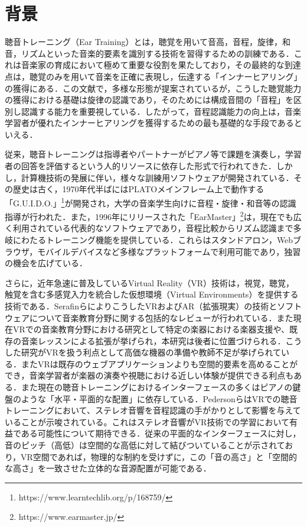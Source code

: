 \section{背景} \label{sec:background}
聴音トレーニング（Ear Training）とは，聴覚を用いて音高，音程，旋律，和音，リズムといった音楽的要素を識別する技術を習得するための訓練である．これは音楽家の育成において極めて重要な役割を果たしており，その最終的な到達点は，聴覚のみを用いて音楽を正確に表現し，伝達する「インナーヒアリング」の獲得にある\cite{woody2012playing}．この文献で，多様な形態が提案されているが，こうした聴覚能力の獲得における基礎は旋律の認識であり，そのためには構成音間の「音程」を区別し認識する能力を重要視している．したがって，音程認識能力の向上は，音楽学習者が優れたインナーヒアリングを獲得するための最も基礎的な手段であるといえる．

従来，聴音トレーニングは指導者やパートナーがピアノ等で課題を演奏し，学習者の回答を評価するという人的リソースに依存した形式で行われてきた．しかし，計算機技術の発展に伴い，様々な訓練用ソフトウェアが開発されている．その歴史は古く，1970年代半ばにはPLATOメインフレーム上で動作する「G.U.I.D.O.」\footnote{https://www.learntechlib.org/p/168759/}が開発され，大学の音楽学生向けに音程・旋律・和音等の認識指導が行われた．また，1996年にリリースされた「EarMaster」\footnote{https://www.earmaster.jp/}は，現在でも広く利用されている代表的なソフトウェアであり，音程比較からリズム認識まで多岐にわたるトレーニング機能を提供している．これらはスタンドアロン，Webブラウザ，モバイルデバイスなど多様なプラットフォームで利用可能であり，独習の機会を広げている．

さらに，近年急速に普及しているVirtual Reality（VR）技術は，視覚，聴覚，触覚を含む多感覚入力を統合した仮想環境（Virtual Environments）を提供する技術である．SerafinらによりこうしたVRおよびAR（拡張現実）の技術とソフトウェアについて音楽教育分野に関する包括的なレビューが行われている\cite{serafin2017considerations}．また現在VRでの音楽教育分野における研究として特定の楽器における楽器支援\cite{gao2024application}や、既存の音楽レッスンによる拡張\cite{liu2025research}が挙げられ，本研究は後者に位置づけられる．こうした研究がVRを扱う利点として高価な機器の準備や教師不足が挙げられている．またVRは既存のウェブアプリケーションよりも空間的要素を高めることができ，音楽学習者が楽器の演奏や視聴における近しい体験が提供できる利点もある．また現在の聴音トレーニングにおけるインターフェースの多くはピアノの鍵盤のような「水平・平面的な配置」に依存している．PedersonらはVRでの聴音トレーニングにおいて、ステレオ音響を音程認識の手がかりとして影響を与えていることが示唆されている\cite{pedersen2020spatialized}。これはステレオ音響がVR技術での学習において有益である可能性について期待できる．従来の平面的なインターフェースに対し，音のピッチ（高低）は空間的な高低に対して結びついていることが示されており\cite{rusconi2006spatial}，VR空間であれば，物理的な制約を受けずに，この「音の高さ」と「空間的な高さ」を一致させた立体的な音源配置が可能である．

